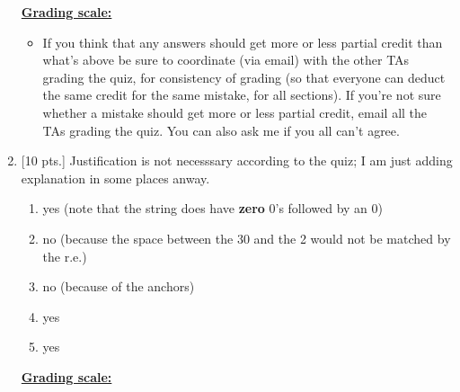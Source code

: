 \documentclass[11pt,fleqn]{article}
\begin{document}
\begin{enumerate}
\begin{info}{\textbf{\underline{Grading scale:}}}
\begin{itemize}
              \item If you think that any answers should get more or less
                    partial credit than what's above be sure to coordinate
                    (via email) with the other TAs grading the quiz, for
                    consistency of grading (so that everyone can deduct the
                    same credit for the same mistake, for all sections).  If
                    you're not sure whether a mistake should get more or
                    less partial credit, email all the TAs grading the quiz.
                    You can also ask me if you all can't agree.

            \end{itemize}

          \end{info}

    \item {[10 pts.]} Justification is not necesssary according to the quiz;
          I am just adding explanation in some places anway.

          \vspace{-2.5mm}

          \begin{multicols}{3}

          \begin{enumerate}

            \addtolength{\itemsep}{1.5mm}

            \item yes (note that the string does have \textbf{zero} 0's
                  followed by an 0)

            \item no (because the space between the 30 and the 2 would not
                  be matched by the r.e.)

            \item no (because of the anchors)

            \item yes

            \item yes

          \end{enumerate}

          \end{multicols}

          \vspace{-2.5mm}

          \begin{info}{\textbf{\underline{Grading scale:}}}


\end{info}
\end{enumerate}
\end{document}
